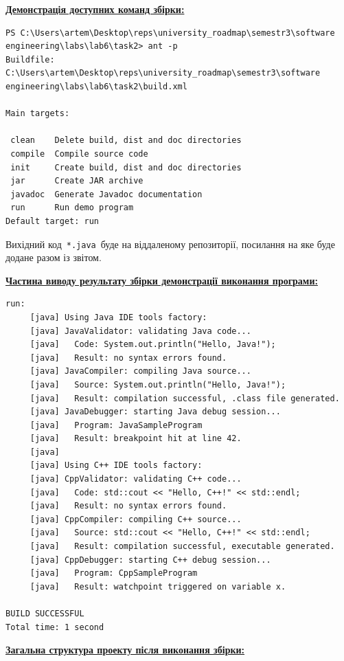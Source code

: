 \documentclass[12pt,a4paper]{article}
\begin{document}
    \textbf{\underline{Демонстрація доступних команд збірки:}}

    \begin{verbatim}
PS C:\Users\artem\Desktop\reps\university_roadmap\semestr3\software engineering\labs\lab6\task2> ant -p 
Buildfile: C:\Users\artem\Desktop\reps\university_roadmap\semestr3\software engineering\labs\lab6\task2\build.xml

Main targets:

 clean    Delete build, dist and doc directories
 compile  Compile source code
 init     Create build, dist and doc directories
 jar      Create JAR archive
 javadoc  Generate Javadoc documentation
 run      Run demo program
Default target: run
    \end{verbatim}

    Вихідний код \,\texttt{*.java}\, буде на віддаленому репозиторії, посилання на яке буде додане разом із звітом.

    \vspace{1em}

    \textbf{\underline{Частина виводу результату збірки демонстрації виконання програми:}}

    \begin{verbatim}
run:
     [java] Using Java IDE tools factory:
     [java] JavaValidator: validating Java code...
     [java]   Code: System.out.println("Hello, Java!");
     [java]   Result: no syntax errors found.
     [java] JavaCompiler: compiling Java source...
     [java]   Source: System.out.println("Hello, Java!");
     [java]   Result: compilation successful, .class file generated.
     [java] JavaDebugger: starting Java debug session...
     [java]   Program: JavaSampleProgram
     [java]   Result: breakpoint hit at line 42.
     [java]
     [java] Using C++ IDE tools factory:
     [java] CppValidator: validating C++ code...
     [java]   Code: std::cout << "Hello, C++!" << std::endl;
     [java]   Result: no syntax errors found.
     [java] CppCompiler: compiling C++ source...
     [java]   Source: std::cout << "Hello, C++!" << std::endl;
     [java]   Result: compilation successful, executable generated.
     [java] CppDebugger: starting C++ debug session...
     [java]   Program: CppSampleProgram
     [java]   Result: watchpoint triggered on variable x.

BUILD SUCCESSFUL
Total time: 1 second
    \end{verbatim}

    \textbf{\underline{Загальна структура проекту після виконання збірки:}}
\end{document}
